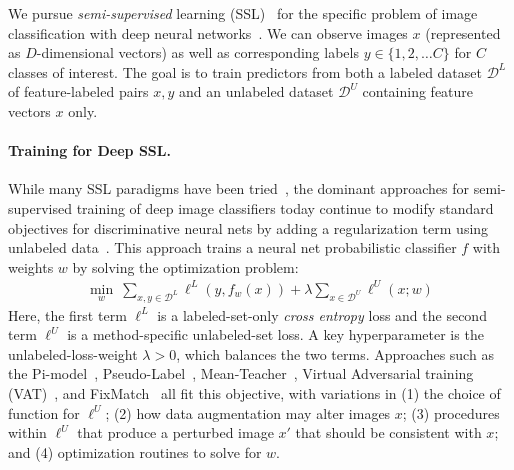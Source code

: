 We pursue \emph{semi-supervised} learning (SSL)~\citep{zhuSemiSupervisedLearningLiterature2005,vanengelenSurveySemisupervisedLearning2020} for the specific problem of image classification with deep neural networks~\citep{oliverRealisticEvaluationDeep2018}.
We can observe images $x$ (represented as $D$-dimensional vectors) as well as corresponding labels $y \in \{1, 2, \ldots C\}$ for $C$ classes of interest.
The goal is to train predictors from both a labeled dataset $\mathcal{D}^L$ of feature-labeled pairs $x,y$ and an unlabeled dataset $\mathcal{D}^U$ containing feature vectors $x$ only.





\paragraph{Training for Deep SSL.}
While many SSL paradigms have been tried~\citep{kingmaSemisupervisedLearningDeep2014,kumarSemisupervisedLearningGANs2017,nalisnickHybridModelsDeep2019}, the dominant approaches for semi-supervised training of deep image classifiers today continue to modify standard objectives for discriminative neural nets by adding a regularization term using unlabeled data~\citep{miyatoVirtualAdversarialTraining2019,sohnFixMatchSimplifyingSemisupervised2020}.
This approach trains a neural net probabilistic classifier $f$ with weights $w$ by solving the optimization problem:
\begin{align} %
\min_{w} ~ \!
	\textstyle \sum_{x,y \in \mathcal{D}^L} \!
		\ell^L( y, f_w(x) )	
	+ 
	\lambda \!
	\sum_{x \in \mathcal{D}^U} \!
		\ell^U(x; w)
	\label{eq:loss-for-consistency-ssl}
\end{align}
Here, the first term $\ell^L$ is a labeled-set-only \emph{cross entropy} loss and the second term $\ell^U$ is a method-specific unlabeled-set loss.
A key hyperparameter is the unlabeled-loss-weight $\lambda > 0$, which balances the two terms.
Approaches such as the Pi-model~\citep{laineTemporalEnsemblingSemiSupervised2017}, Pseudo-Label~\citep{leePseudoLabelSimpleEfficient2013}, Mean-Teacher~\citep{tarvainenMeanTeachersAre2017}, Virtual Adversarial training (VAT)~\citep{miyatoVirtualAdversarialTraining2019}, and FixMatch~\citep{sohnFixMatchSimplifyingSemisupervised2020} all fit this objective, with variations in (1) the choice of function for $\ell^U$; (2) how data augmentation may alter images $x$; (3) procedures within $\ell^U$ that produce a perturbed image $x'$ that should be consistent with $x$; and (4) optimization routines to solve for $w$.

